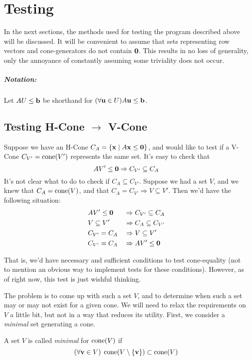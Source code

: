 \chapter{Testing}

In the next sections, the methods used for testing the program described above will be discussed.  It will be convenient to assume that sets representing row vectors and cone-generators do not contain $\mathbf{0}$.  This results in no loss of generality, only the annoyance of constantly assuming some triviality does not occur.

\paragraph{Notation:} Let $AU \leq \mathbf{b}$ be shorthand for $(\forall \mathbf{u}\in U) A\mathbf{u} \leq \mathbf{b}$.

\section{Testing H-Cone $\to$ V-Cone}
Suppose we have an H-Cone $C_A= \left\{\mathbf{x}\;|\; A\mathbf{x}\leq\mathbf{0}\right\}$, and would like to test if a V-Cone $C_{V'} = \operatorname{cone}(V')$ represents the same set.  It's easy to check that
\[ AV'\leq\mathbf{0} \Rightarrow C_{V'} \subseteq C_A\]
It's not clear what to do to check if $C_A\subseteq C_{V'}$.  Suppose we had a set $V$, and we knew that $C_A= \operatorname{cone}(V)$, and that $C_A= C_{V'} \Rightarrow V \subseteq V'$.  Then we'd have the following situation:
\begin{alignat*}{2}
	 & AV'\leq\mathbf{0} \;      & \Rightarrow & \; C_{V'} \subseteq C_A \\
	 & V \subseteq V' \; & \Rightarrow & \; C_A\subseteq C_{V'}  \\
	 & C_{V'} = C_A \;   & \Rightarrow & \; V \subseteq V'       \\
	 & C_{V'} = C_A \;   & \Rightarrow & \; AV'\leq\mathbf{0}
\end{alignat*}

That is, we'd have necessary and sufficient conditions to test cone-equality (not to mention an obvious way to implement tests for these conditions).  However, as of right now, this test is just wishful thinking.

The problem is to come up with such a set $V$, and to determine when such a set may or may not exist for a given cone.  We will need to relax the requirements on $V$ a little bit, but not in a way that reduces its utility.  First, we consider a \textit{minimal} set generating a cone.

\begin{Def}
	A set $V$ is called \textit{minimal} for $\operatorname{cone}(V)$ if
	\[ (\forall \mathbf{v} \in V)\; \operatorname{cone}(V\setminus\{\mathbf{v}\}) \subset \operatorname{cone}(V) \]
\end{Def}

